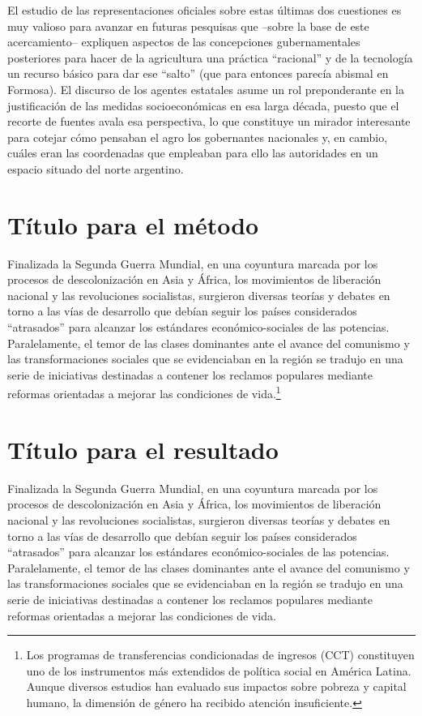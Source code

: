 \documentclass{article}
\begin{document}
El estudio de las representaciones oficiales sobre estas últimas dos cuestiones es muy valioso para avanzar en futuras pesquisas que –sobre la base de este acercamiento– expliquen aspectos de las concepciones gubernamentales posteriores para hacer de la agricultura una práctica “racional” y de la tecnología un recurso básico para dar ese “salto” (que para entonces parecía abismal en Formosa). El discurso de los agentes estatales asume un rol preponderante en la justificación de las medidas socioeconómicas en esa larga década, puesto que el recorte de fuentes avala esa perspectiva, lo que constituye un mirador interesante para cotejar cómo pensaban el agro los gobernantes nacionales y, en cambio, cuáles eran las coordenadas que empleaban para ello las autoridades en un espacio situado del norte argentino.


\section{Título para el método}
Finalizada la Segunda Guerra Mundial, en una coyuntura marcada por los procesos de descolonización en Asia y África, los movimientos de liberación nacional y las revoluciones socialistas, surgieron diversas teorías y debates en torno a las vías de desarrollo que debían seguir los países considerados “atrasados” para alcanzar los estándares económico-sociales de las potencias. Paralelamente, el temor de las clases dominantes ante el avance del comunismo y las transformaciones sociales que se evidenciaban en la región se tradujo en una serie de iniciativas destinadas a contener los reclamos populares mediante reformas orientadas a mejorar las condiciones de vida.\footnote{Los programas de transferencias condicionadas de ingresos (CCT)
  constituyen uno de los instrumentos más extendidos de política social en
  América Latina. Aunque diversos estudios han evaluado sus impactos sobre
  pobreza y capital humano, la dimensión de género ha recibido atención
  insuficiente.}


\section{Título para el resultado}
Finalizada la Segunda Guerra Mundial, en una coyuntura marcada por los procesos de descolonización en Asia y África, los movimientos de liberación nacional y las revoluciones socialistas, surgieron diversas teorías y debates en torno a las vías de desarrollo que debían seguir los países considerados “atrasados” para alcanzar los estándares económico-sociales de las potencias. Paralelamente, el temor de las clases dominantes ante el avance del comunismo y las transformaciones sociales que se evidenciaban en la región se tradujo en una serie de iniciativas destinadas a contener los reclamos populares mediante reformas orientadas a mejorar las condiciones de vida.
\end{document}

